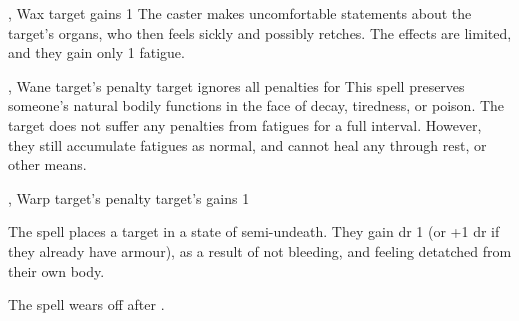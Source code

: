   {\mFate, \mAir}%
  {Wax}%
  {}%
  {}%
  {target gains 1 }%
  {
    The caster makes uncomfortable statements about the target's organs, who then feels sickly and possibly retches.
    The effects are limited, and they gain only 1 \gls{fatigue}.
  }

  {\mFate, \mAir}%
  {Wane}%
  {}%
  {target's  penalty}%
  {target ignores all  penalties for }%
  {
    This spell preserves someone's natural bodily functions in the face of decay, tiredness, or poison.
    The target does not suffer any penalties from \glspl{fatigue} for a full \gls{interval}.
    However, they still accumulate \glspl{fatigue} as normal, and cannot heal any through rest, or other means.
  }

  {\mFate, \mAir}%
  {Warp}%
  {}%
  {target's  penalty}%
  {target's gains  1}%
  {
    The spell places a target in a state of semi-undeath.
    They gain \gls{dr} 1 (or +1 \gls{dr} if they already have armour), as a result of not bleeding, and feeling detatched from their own body.

    The spell wears off after .
  }

